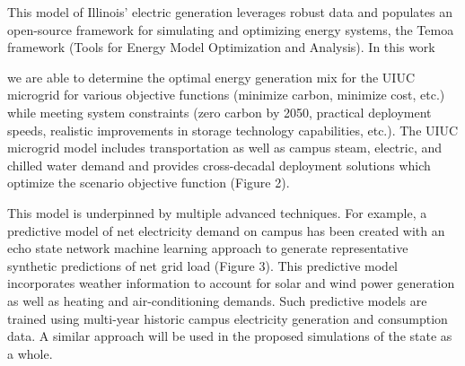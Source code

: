 This model of Illinois' electric generation leverages robust data and populates 
an open-source framework for simulating and optimizing energy systems, 
the Temoa framework (Tools for Energy Model Optimization and Analysis). 
In this work 

we are able to determine the optimal energy generation mix 
for the UIUC microgrid for various objective functions (minimize carbon, 
minimize cost, etc.) while meeting system constraints (zero carbon by 2050, 
practical deployment speeds, realistic improvements in storage technology 
capabilities, etc.). The UIUC microgrid model includes transportation as well 
as campus steam, electric, and chilled water demand and provides cross-decadal 
deployment solutions which optimize the scenario objective function (Figure 2).

This model is underpinned by multiple advanced techniques. For example, a 
predictive model of net electricity demand on campus has been created with an 
echo state network machine learning approach to generate representative 
synthetic predictions of net grid load (Figure 3). This predictive model 
incorporates weather information to account for solar and wind power generation 
as well as heating and air-conditioning demands. Such predictive models are 
trained using multi-year historic campus electricity generation and consumption 
data. A similar approach will be used in the proposed simulations of the state 
as a whole.




